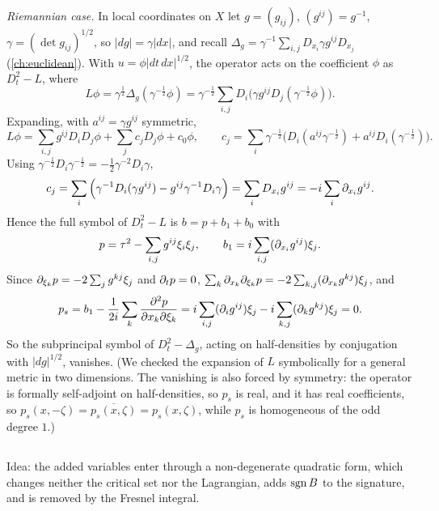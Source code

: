 \emph{Riemannian case.} In local coordinates on $X$ let $g=(g_{ij})$, $(g^{ij})=g^{-1}$,
$\gamma=(\det g_{ij})^{1/2}$, so $|dg|=\gamma|dx|$, and recall
$\Delta_g=\gamma^{-1}\sum_{i,j}D_{x_i}\gamma g^{ij}D_{x_j}$ (\cref{ch:euclidean}). With
$u=\phi|dt\,dx|^{1/2}$, the operator acts on the coefficient $\phi$ as
$D_t^2-L$, where
\begin{equation*}
L\phi=\gamma^{\frac12}\Delta_g(\gamma^{-\frac12}\phi)=\gamma^{-\frac12}\sum_{i,j}D_i\big(\gamma
g^{ij}D_j(\gamma^{-\frac12}\phi)\big).
\end{equation*}
Expanding, with $a^{ij}=\gamma g^{ij}$ symmetric,
\begin{equation*}
L\phi=\sum_{i,j}g^{ij}D_iD_j\phi+\sum_jc_jD_j\phi+c_0\phi,\qquad
c_j=\sum_i\gamma^{-\frac12}\Big(D_i(a^{ij}\gamma^{-\frac12})+a^{ij}D_i(\gamma^{-\frac12})\Big).
\end{equation*}
Using $\gamma^{-\frac12}D_i\gamma^{-\frac12}=-\frac12\gamma^{-2}D_i\gamma$,
\begin{equation*}
c_j=\sum_i\Big(\gamma^{-1}D_i(\gamma g^{ij})-g^{ij}\gamma^{-1}D_i\gamma\Big)=\sum_iD_{x_i}g^{ij}
=-i\sum_i\partial_{x_i}g^{ij}.
\end{equation*}
Hence the full symbol of $D_t^2-L$ is $b=p+b_1+b_0$ with
\begin{equation*}
p=\tau^2-\sum_{i,j}g^{ij}\xi_i\xi_j,\qquad b_1=i\sum_{i,j}(\partial_{x_i}g^{ij})\xi_j .
\end{equation*}
Since $\partial_{\xi_k}p=-2\sum_jg^{kj}\xi_j$ and $\partial_tp=0$, $\sum_k\partial_{x_k}\partial_{\xi_k}p=
-2\sum_{k,j}(\partial_{x_k}g^{kj})\xi_j$, and
\begin{equation*}
p_s=b_1-\frac1{2i}\sum_k\frac{\partial^2p}{\partial x_k\partial\xi_k}=i\sum_{i,j}(\partial_ig^{ij})\xi_j-i\sum_{k,j}
(\partial_kg^{kj})\xi_j=0 .
\end{equation*}
So the subprincipal symbol of $D_t^2-\Delta_g$, acting on half-densities by conjugation with
$|dg|^{1/2}$, vanishes. (We checked the expansion of $L$ symbolically for a general metric in
two dimensions. The vanishing is also forced by symmetry: the operator is formally
self-adjoint on half-densities, so $p_s$ is real, and it has real coefficients, so
$p_s(x,-\zeta)=\overline{p_s(x,\zeta)}=p_s(x,\zeta)$, while $p_s$ is homogeneous of the odd
degree $1$.)

\subsection*{}
Idea: the added variables enter through a non-degenerate quadratic form, which changes neither
the critical set nor the Lagrangian, adds $\operatorname{sgn} B$ to the signature, and is removed by the
Fresnel integral.

